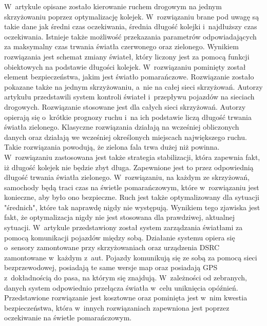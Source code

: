 \newline
\indent
W~artykule \cite{de1998optimal} opisane zostało kierowanie ruchem drogowym na jednym skrzyżowaniu poprzez optymalizację kolejek. W~rozwiązaniu brane pod uwagę są takie dane jak średni czas oczekiwania, średnia długość kolejki i~najdłuższy czas oczekiwania. Istnieje także możliwość przekazania parametrów odpowiadających za maksymalny czas trwania światła czerwonego oraz zielonego. Wynikiem rozwiązania jest schemat zmiany świateł, który liczony jest za pomocą funkcji obiektowych na podstawie długości kolejek. W~rozwiązaniu pominięty został element bezpieczeństwa, jakim jest światło pomarańczowe. Rozwiązanie zostało pokazane także na jednym skrzyżowaniu, a~nie na całej sieci skrzyżowań.
\newline
\indent
  Autorzy artykułu \cite{lammer2008self} przedstawili system kontroli świateł i~przepływu pojazdów na sieciach drogowych. Rozwiązanie stosowane jest dla całych sieci skrzyżowań. Autorzy opierają się o~krótkie prognozy ruchu i~na ich podstawie liczą długość trwania światła zielonego. Klasyczne rozwiązania działają na wcześniej obliczonych danych oraz działają we wcześniej określonych miejscach największego ruchu. Takie rozwiązania powodują, że zielona fala trwa dużej niż powinna. W~rozwiązaniu zastosowana jest także strategia stabilizacji, która zapewnia fakt, iż długość kolejek nie będzie zbyt długa. Zapewnione jest to przez odpowiednią długość trwania światła zielonego. W~rozwiązaniu, na każdym ze skrzyżowań, samochody będą traci czas na świetle pomarańczowym, które w~rozwiązaniu jest konieczne, aby było ono bezpieczne. Ruch jest także optymalizowany dla sytuacji "średnich", które tak naprawdę nigdy nie występują. Wynikiem tego zjawiska jest fakt, że optymalizacja nigdy nie jest stosowana dla prawdziwej, aktualnej sytuacji.
\newline
\indent
W~artykule \cite{ferreira2010self} przedstawiony został system zarządzania światłami za pomocą komunikacji pojazdów między sobą. Działanie systemu opiera się o~sensory zamontowane przy skrzyżowaniach oraz urządzenia DSRC zamontowane w~każdym z~aut. Pojazdy komunikują się ze sobą za pomocą sieci bezprzewodowej, posiadają te same wersje map oraz posiadają GPS z~dokładnością do pasa, na którym się znajdują. W~zależności od zebranych, danych system odpowiednio przełącza światła w~celu uniknięcia opóźnień. Przedstawione rozwiązanie jest kosztowne oraz pominięta jest w~nim kwestia bezpieczeństwa, która w~innych rozwiązaniach zapewniona jest poprzez oczekiwanie na świetle pomarańczowym.
    
